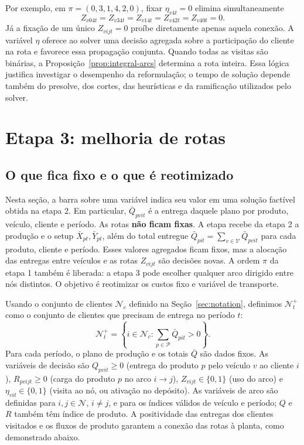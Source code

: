 \documentclass[11pt,a4paper]{article}
\newcommand{\N}{\mathcal{N}}
\newcommand{\Pset}{\mathcal{P}}
\newcommand{\Vset}{\mathcal{V}}
\begin{document}
Por exemplo, em $\pi=(0,3,1,4,2,0)$, fixar $\eta_{v4t}=0$ elimina simultaneamente
\[
 Z_{v04t}=Z_{v34t}=Z_{v14t}=Z_{v42t}=Z_{v40t}=0.
\]
Já a fixação de um único $Z_{vijt}=0$ proíbe diretamente apenas aquela conexão. A variável $\eta$ oferece ao solver uma decisão agregada sobre a participação do cliente na rota e favorece essa propagação conjunta. Quando todas as visitas são binárias, a Proposição~\ref{prop:integral-arcs} determina a rota inteira. Essa lógica justifica investigar o desempenho da reformulação; o tempo de solução depende também do presolve, dos cortes, das heurísticas e da ramificação utilizados pelo solver.

\section{Etapa 3: melhoria de rotas}

\subsection{O que fica fixo e o que é reotimizado}

Nesta seção, a barra sobre uma variável indica seu valor em uma solução factível obtida na etapa 2. Em particular, $\bar Q_{pvit}$ é a entrega daquele plano por produto, veículo, cliente e período. As rotas \textbf{não ficam fixas}. A etapa recebe da etapa 2 a produção e o setup $\bar X_{pt},\bar Y_{pt}$, além do total entregue $\bar Q_{pit}=\sum_{v\in\Vset}\bar Q_{pvit}$ para cada produto, cliente e período. Esses valores agregados ficam fixos, mas a alocação das entregas entre veículos e as rotas $Z_{vijt}$ são decisões novas. A ordem $\pi$ da etapa 1 também é liberada: a etapa 3 pode escolher qualquer arco dirigido entre nós distintos. O objetivo é reotimizar os custos fixo e variável de transporte.

Usando o conjunto de clientes $\N_c$ definido na Seção~\ref{sec:notation}, definimos $\N_t^+$ como o conjunto de clientes que precisam de entrega no período $t$:
\[
 \N_t^+=\left\{i\in\N_c:\sum_{p\in\Pset}\bar Q_{pit}>0\right\}.
\]
Para cada período, o plano de produção e os totais $\bar Q$ são dados fixos. As variáveis de decisão são $Q_{pvit}\ge0$ (entrega do produto $p$ pelo veículo $v$ ao cliente $i$), $R_{pvijt}\ge0$ (carga do produto $p$ no arco $i\to j$), $Z_{vijt}\in\{0,1\}$ (uso do arco) e $\eta_{vit}\in\{0,1\}$ (visita ao nó, ou ativação no depósito). As variáveis de arco são definidas para $i,j\in\N$, $i\ne j$, e para os índices válidos de veículo e período; $Q$ e $R$ também têm índice de produto. A positividade das entregas dos clientes visitados e os fluxos de produto garantem a conexão das rotas à planta, como demonstrado abaixo.
\end{document}
